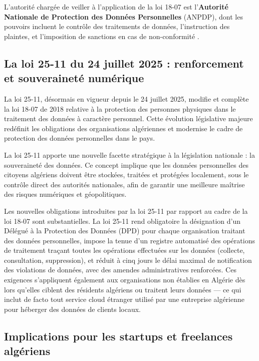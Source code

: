 L'autorité chargée de veiller à l'application de la loi 18-07 est l'\textbf{Autorité Nationale de Protection des Données Personnelles} (ANPDP), dont les pouvoirs incluent le contrôle des traitements de données, l'instruction des plaintes, et l'imposition de sanctions en cas de non-conformité \cite{loi-18-07-guide}.

\subsection*{La loi 25-11 du 24 juillet 2025 : renforcement et souveraineté numérique}

La loi 25-11, désormais en vigueur depuis le 24 juillet 2025, modifie et complète la loi 18-07 de 2018 relative à la protection des personnes physiques dans le traitement des données à caractère personnel. Cette évolution législative majeure redéfinit les obligations des organisations algériennes et modernise le cadre de protection des données personnelles dans le pays. 

La loi 25-11 apporte une nouvelle facette stratégique à la législation nationale : la souveraineté des données. Ce concept implique que les données personnelles des citoyens algériens doivent être stockées, traitées et protégées localement, sous le contrôle direct des autorités nationales, afin de garantir une meilleure maîtrise des risques numériques et géopolitiques. 

Les nouvelles obligations introduites par la loi 25-11 par rapport au cadre de la loi 18-07 sont substantielles. La loi 25-11 rend obligatoire la désignation d'un Délégué à la Protection des Données (DPD) pour chaque organisation traitant des données personnelles, impose la tenue d'un registre automatisé des opérations de traitement traçant toutes les opérations effectuées sur les données (collecte, consultation, suppression), et réduit à cinq jours le délai maximal de notification des violations de données, avec des amendes administratives renforcées.  Ces exigences s'appliquent également aux organisations non établies en Algérie dès lors qu'elles ciblent des résidents algériens ou traitent leurs données — ce qui inclut de facto tout service cloud étranger utilisé par une entreprise algérienne pour héberger des données de clients locaux.

\subsection*{Implications pour les startups et freelances algériens}

